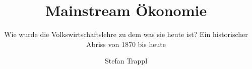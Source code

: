 \documentclass[envcountsame,envcountchap]{svmono}
\begin{document}
\author{Stefan Trappl}
\title{Mainstream Ökonomie}
\subtitle{Wie wurde die Volkswirtschaftslehre zu dem was sie heute ist? Ein historischer Abriss von 1870 bis heute}
\maketitle

\frontmatter%




\tableofcontents


\mainmatter%





















%



\backmatter%

\printbibliography  
\printindex


\end{document}
